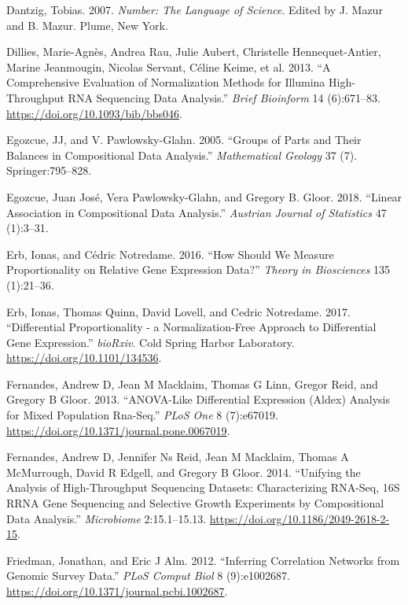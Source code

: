 \documentclass[onecolumn]{book}
\theoremstyle{definition}
\theoremstyle{definition}
\theoremstyle{definition}
\theoremstyle{remark}
\begin{document}
\leavevmode\hypertarget{ref-number}{}%
Dantzig, Tobias. 2007. \emph{Number: The Language of Science}. Edited by
J. Mazur and B. Mazur. Plume, New York.

\leavevmode\hypertarget{ref-Dillies:2013}{}%
Dillies, Marie-Agnès, Andrea Rau, Julie Aubert, Christelle
Hennequet-Antier, Marine Jeanmougin, Nicolas Servant, Céline Keime, et
al. 2013. ``A Comprehensive Evaluation of Normalization Methods for
Illumina High-Throughput RNA Sequencing Data Analysis.'' \emph{Brief
Bioinform} 14 (6):671--83. \url{https://doi.org/10.1093/bib/bbs046}.

\leavevmode\hypertarget{ref-egozcue2005}{}%
Egozcue, JJ, and V. Pawlowsky-Glahn. 2005. ``Groups of Parts and Their
Balances in Compositional Data Analysis.'' \emph{Mathematical Geology}
37 (7). Springer:795--828.

\leavevmode\hypertarget{ref-egozcue:AJS}{}%
Egozcue, Juan José, Vera Pawlowsky-Glahn, and Gregory B. Gloor. 2018.
``Linear Association in Compositional Data Analysis.'' \emph{Austrian
Journal of Statistics} 47 (1):3--31.

\leavevmode\hypertarget{ref-erb:2016}{}%
Erb, Ionas, and Cédric Notredame. 2016. ``How Should We Measure
Proportionality on Relative Gene Expression Data?'' \emph{Theory in
Biosciences} 135 (1):21--36.

\leavevmode\hypertarget{ref-Erb134536}{}%
Erb, Ionas, Thomas Quinn, David Lovell, and Cedric Notredame. 2017.
``Differential Proportionality - a Normalization-Free Approach to
Differential Gene Expression.'' \emph{bioRxiv}. Cold Spring Harbor
Laboratory. \url{https://doi.org/10.1101/134536}.

\leavevmode\hypertarget{ref-fernandes:2013}{}%
Fernandes, Andrew D, Jean M Macklaim, Thomas G Linn, Gregor Reid, and
Gregory B Gloor. 2013. ``ANOVA-Like Differential Expression (Aldex)
Analysis for Mixed Population Rna-Seq.'' \emph{PLoS One} 8 (7):e67019.
\url{https://doi.org/10.1371/journal.pone.0067019}.

\leavevmode\hypertarget{ref-fernandes:2014}{}%
Fernandes, Andrew D, Jennifer Ns Reid, Jean M Macklaim, Thomas A
McMurrough, David R Edgell, and Gregory B Gloor. 2014. ``Unifying the
Analysis of High-Throughput Sequencing Datasets: Characterizing RNA-Seq,
16S RRNA Gene Sequencing and Selective Growth Experiments by
Compositional Data Analysis.'' \emph{Microbiome} 2:15.1--15.13.
\url{https://doi.org/10.1186/2049-2618-2-15}.

\leavevmode\hypertarget{ref-Friedman:2012}{}%
Friedman, Jonathan, and Eric J Alm. 2012. ``Inferring Correlation
Networks from Genomic Survey Data.'' \emph{PLoS Comput Biol} 8
(9):e1002687. \url{https://doi.org/10.1371/journal.pcbi.1002687}.
\end{document}

